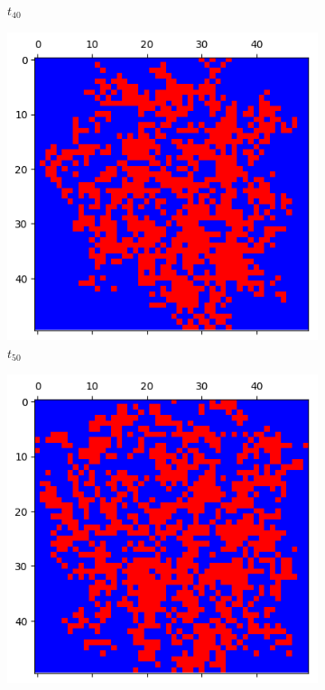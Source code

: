 \documentclass[letterpaper]{article}
\begin{document}
\begin{figure}[H]
\begin{subfigure}{.33\textwidth}
      \caption{$t_{40}$}
    \end{subfigure}
    \begin{subfigure}{.33\textwidth}
      \centering
      \includegraphics[width=1\linewidth]{images/assign2/part32-coop/t50}
      \caption{$t_{50}$}
    \end{subfigure}
    \begin{subfigure}{.33\textwidth}
      \centering
      \includegraphics[width=1\linewidth]{images/assign2/part32-coop/t60}

\end{subfigure}
\end{figure}
\end{document}
